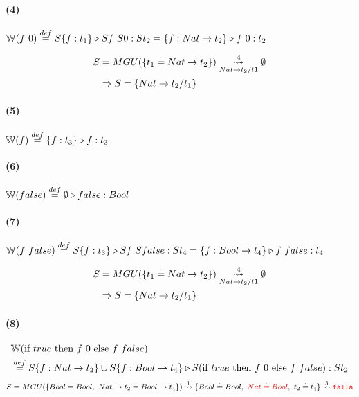 \documentclass[10pt,a4paper]{article}
\begin{document}
\paragraph{(4)} $\WFunc(f~0) \equalDef \judgeType{S\{f:t_1\}}{Sf~S0}{St_2} = \judgeType{\{f:Nat\to t_2\}}{f~0}{t_2}$

\begin{centrado}
\begin{align*}
S &= MGU(\{t_1\equalDot Nat \to t_2\}) \goesTo{4}{Nat\to t_2/t1}  \emptyset \\
&\Rightarrow S=\{Nat\to t_2/t_1\}
\end{align*}
\end{centrado}

\vspace*{5mm}
\begin{multicols}{2}
\paragraph{(5)} $\WFunc(f) \equalDef \judgeType{\{f:t_3\}}{f}{t_3}$

\paragraph{(6)} $\WFunc(false) \equalDef \judgeType{\emptyset}{false}{Bool}$
\end{multicols}


\paragraph{(7)} $\WFunc(f~false) \equalDef \judgeType{S\{f:t_3\}}{Sf~Sfalse}{St_4} = \judgeType{\{f:Bool\to t_4\}}{f~false}{t_4}$

\begin{centrado}
\begin{align*}
S &= MGU(\{t_1\equalDot Nat \to t_2\}) \goesTo{4}{Nat\to t_2/t1}  \emptyset \\
&\Rightarrow S=\{Nat\to t_2/t_1\}
\end{align*}
\end{centrado}



\paragraph{(8)} 
\begin{align*}
&\WFunc(\lambdaIf{true}{f~0}{f~false}) \\
&\equalDef \judgeType{S\{f:Nat\to t_2\} \cup S\{f:Bool\to t_4\}}{S(\lambdaIf{true}{f~0}{f~false})}{St_2} \\
\end{align*}
\begin{align*}
S &= MGU(\{Bool\equalDot Bool,~Nat\to t_2 \equalDot Bool \to t_4\}) \goesTo{1}{} \{Bool\equalDot Bool,~\red{Nat \equalDot Bool},~t_2 \equalDot t_4\} \goesTo{5}{} \falla\\
\end{align*}
\end{document}
